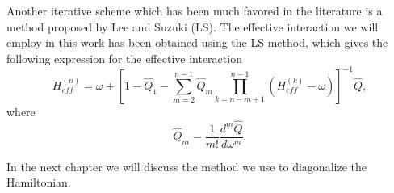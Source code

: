 Another iterative scheme which has been much favored in the literature
is a method proposed by Lee and Suzuki (LS). The effective interaction
we will employ in this work has been obtained using the LS method, which
gives the following expression for the effective interaction
%
\begin{equation}
H_{eff}^{(n)} =  \omega + \left[1-\hat{Q}_{1}-\sum_{m=2}^{n-1}\hat{Q}_{m}
\prod_{k=n-m+1}^{n-1} \left ( H_{eff}^{(k)} - \omega \right )
              \right]^{-1}\hat{Q},
\end{equation}
where
\begin{equation}
\hat{Q}_{m}=\frac{1}{m!}\frac{d^m\hat{Q}}{d\omega^m}.
\end{equation}
%



In the next chapter we will discuss the method we use to diagonalize the
Hamiltonian.
